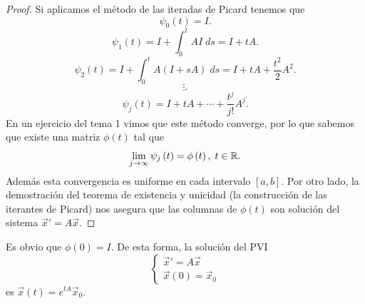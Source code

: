 \begin{proof}
Si aplicamos el método de las iteradas de Picard tenemos que
\[\psi_{0}\left(t\right)=I .\]
\[\psi_{1}\left(t\right)=I + \int^{t}_{0} AI \; d s = I + tA .\]
\[\psi_{2}\left(t\right)=I + \int^{t}_{0} A\left(I + sA\right) \; d s= I + tA + \frac{t ^{2}}{2}A^{2} .\]
\[\vdots .\]
\[\psi_{j}\left(t\right)=I + tA + \cdots + \frac{t ^{j}}{j!}A^{j} .\]
En un ejercicio del tema 1 vimos que este método converge, por lo que sabemos que existe una matriz $\displaystyle \phi\left(t\right) $ tal que 
\[\lim_{j  \to \infty}\psi_{j}\left(t\right)=\phi\left(t\right), \; t \in \mathbb{R} .\]
Además esta convergencia es uniforme en cada intervalo $\displaystyle \left[a,b\right]  $. Por otro lado, la demostración del teorema de existencia y unicidad (la construcción de las iterantes de Picard) nos asegura que las columnas de $\displaystyle \phi\left(t\right) $ son solución del sistema $\displaystyle \vec{x}' = A\vec{x} $.  
\end{proof}
\begin{observation}
Es obvio que $\displaystyle \phi\left(0\right)=I $. De esta forma, la solución del PVI
\[
\begin{cases}
\vec{x}' = A\vec{x}\\
\vec{x}\left(0\right)=\vec{x}_{0}
\end{cases}
\]
es $\displaystyle \vec{x}\left(t\right)=e^{tA}\vec{x}_{0} $.
\end{observation}
